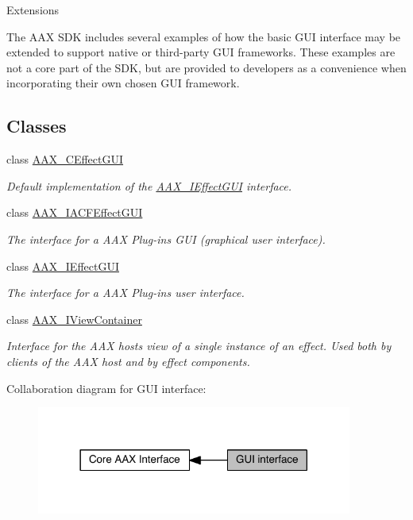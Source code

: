 \begin{DoxyParagraph}{Extensions}

\end{DoxyParagraph}
The A\+A\+X S\+D\+K includes several examples of how the basic G\+U\+I interface may be extended to support native or third-\/party G\+U\+I frameworks. These examples are not a core part of the S\+D\+K, but are provided to developers as a convenience when incorporating their own chosen G\+U\+I framework. \subsection*{Classes}
\begin{DoxyCompactItemize}
\item 
class \hyperlink{a00017}{A\+A\+X\+\_\+\+C\+Effect\+G\+U\+I}
\begin{DoxyCompactList}\small\item\em Default implementation of the \hyperlink{a00098}{A\+A\+X\+\_\+\+I\+Effect\+G\+U\+I} interface. \end{DoxyCompactList}\item 
class \hyperlink{a00060}{A\+A\+X\+\_\+\+I\+A\+C\+F\+Effect\+G\+U\+I}
\begin{DoxyCompactList}\small\item\em The interface for a A\+A\+X Plug-\/in\textquotesingle{}s G\+U\+I (graphical user interface). \end{DoxyCompactList}\item 
class \hyperlink{a00098}{A\+A\+X\+\_\+\+I\+Effect\+G\+U\+I}
\begin{DoxyCompactList}\small\item\em The interface for a A\+A\+X Plug-\/in\textquotesingle{}s user interface. \end{DoxyCompactList}\item 
class \hyperlink{a00117}{A\+A\+X\+\_\+\+I\+View\+Container}
\begin{DoxyCompactList}\small\item\em Interface for the A\+A\+X host\textquotesingle{}s view of a single instance of an effect. Used both by clients of the A\+A\+X host and by effect components. \end{DoxyCompactList}\end{DoxyCompactItemize}
Collaboration diagram for G\+U\+I interface\+:
\nopagebreak
\begin{figure}[H]
\begin{center}
\leavevmode
\includegraphics[width=294pt]{a00329}
\end{center}
\end{figure}
